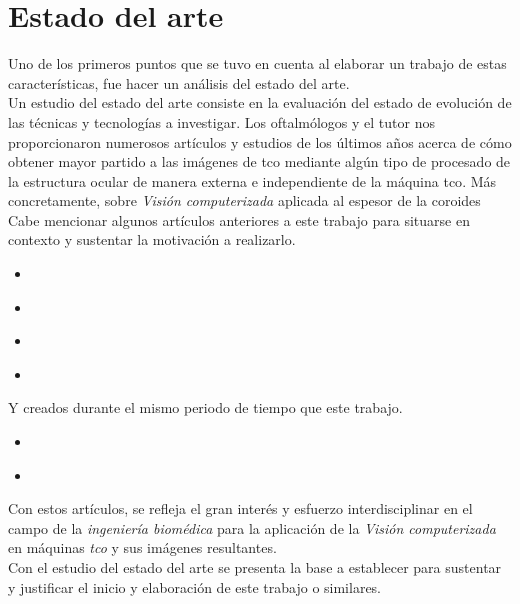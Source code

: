 \chapter{Estado del arte}\label{ch:estado_arte}
Uno de los primeros puntos que se tuvo en cuenta al elaborar un
trabajo de estas características, fue hacer un análisis del estado del
arte.\\
Un estudio del estado del arte consiste en la evaluación del estado de
evolución de las técnicas y tecnologías a investigar. Los oftalmólogos
y el tutor nos proporcionaron numerosos artículos y estudios de los
últimos años acerca de cómo obtener mayor partido a las imágenes de
\gls{tco} mediante algún tipo de procesado de la estructura ocular de
manera externa e independiente de la máquina \gls{tco}. Más
concretamente, sobre \emph{Visión computerizada} aplicada al espesor
de la \gls{coroides}\\
Cabe mencionar algunos artículos anteriores a este trabajo para
situarse en contexto y sustentar la motivación a realizarlo.
\begin{itemize}
\item \emph{\citep*[Automated choroidal segmentation of 1060 nm OCT in
    healthy and pathologic eyes using a statistical
    model]{kajic2012automated}}
\item \emph{\citep*[Automatic segmentation of the choroid in enhanced
    depth imaging optical coherence tomography
    images]{tian2013automatic}}
\item \emph{\citep*[Automatic segmentation of choroidal thickness in
    optical coherence tomography]{alonso2013automatic}}
\item \emph{\citep*[Segmentation of choroidal boundary in enhanced
    depth imaging OCTs using a multiresolution texture based modeling
    in graph cuts]{danesh2014segmentation}}
\end{itemize}
Y creados durante el mismo periodo de tiempo que este trabajo.
\begin{itemize}
\item \emph{\citep*[Evaluation of choroidal thickness via enhanced
    depth-imaging optical coherence tomography in patients with
    systemic hypertension]{gok2015evaluation}}
\item \emph{\citep*[Optical modelling of the human
    retina]{ara2015optical}}
\end{itemize}
Con estos artículos, se refleja el gran interés y esfuerzo
interdisciplinar en el campo de la \emph{ingeniería biomédica} para la
aplicación de la \emph{Visión computerizada} en máquinas
\emph{\gls{tco}} y sus imágenes resultantes.\\
Con el estudio del estado del arte se presenta la base a establecer
para sustentar y justificar el inicio y elaboración de este trabajo o
similares.
